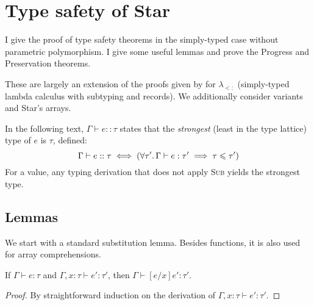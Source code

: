\chapter{Type safety of Star}
\label{extra:star-proofs}

I give the proof of type safety theorems in the simply-typed case without parametric polymorphism. I give some useful lemmas and prove the Progress and Preservation theorems.

These are largely an extension of the proofs given by \textcite{tapl} for $\lambda_{<:}$ (simply-typed lambda calculus with subtyping and records). We additionally consider variants and Star's arrays.

In the following text, $\Gamma \vdash e :: \tau$ states that the \textit{strongest} (least in the type lattice) type of $e$ is $\tau$, defined: 
$$ \Gamma \vdash e :: \tau \iff \left( \forall \tau' \ldotp \Gamma \vdash e : \tau' \implies \tau \sub \tau' \right) $$ 
For a value, any typing derivation that does not apply \textsc{Sub} yields the strongest type.

\section*{Lemmas}

We start with a standard substitution lemma. Besides functions, it is also used for array comprehensions.
\begin{lemma}[Substitution]
    If $\Gamma \vdash e : \tau$ and $\Gamma, x : \tau \vdash e' : \tau'$, then $\Gamma \vdash [e/x]e' : \tau'$.
\end{lemma}
\begin{proof}
By straightforward induction on the derivation of $\Gamma, x : \tau \vdash e' : \tau'$. 
\end{proof}

